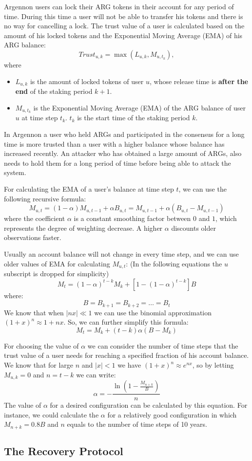 Argennon users can lock their ARG tokens in their account for any period of time. During this time a user
will not be able to transfer his tokens and there is no way for cancelling a lock.
The trust value of a user is calculated based on the amount of his locked tokens and the
Exponential Moving Average (EMA) of his ARG balance:
\[
    Trust_{u,k} = \max (L_{u,k}, M_{u,t_k}),
\]
where
\begin{itemize}
    \item $L_{u,k}$ is the amount of locked tokens of user $u$, whose release time is \textbf{after the end} of
    the staking period $k+1$.
    \item $M_{u,t_k}$ is the Exponential Moving Average (EMA) of the ARG balance of user \(u\) at time step \(t_k\).
    $t_k$ is the start time of the staking period $k$.
\end{itemize}

In Argennon a user who held ARGs and participated in the consensus for a long time is more trusted
than a user with a higher balance whose balance has increased recently. An attacker who has obtained a large
amount of ARGs, also needs to hold them for a long period of time before being able to attack the system.

For calculating the EMA of a user's balance at time step \(t\), we can use the following
recursive formula:
\[
    M_{u,t} = (1 - \alpha) M_{u,t-1} + \alpha B_{u,t} = M_{u,t-1} + \alpha (B_{u,t} - M_{u,t-1})
\]
where the coefficient \(\alpha\) is a constant smoothing factor between \(0\) and \(1\), which represents the
degree of weighting decrease. A higher \(\alpha\) discounts older observations faster.

Usually an account balance will not change in every time step, and we can use older values of EMA for calculating
\(M_{u,t}\): (In the following equations the \(u\) subscript is dropped for simplicity)
\[
    M_{t} = (1 - \alpha)^{t-k}M_{k} + [1 - (1 - \alpha)^{t - k}]B
\]
where:
\[
    B = B_{k+1} = B_{k+2} = \dots = B_{t}
\]
We know that when \(|nx| \ll 1\) we can use the binomial approximation \({(1 + x)^n \approx 1 + nx}\). So, we can
further simplify this formula:
\[
    M_{t} = M_{k} + (t - k) \alpha (B - M_{k})
\]

For choosing the value of \(\alpha\) we can consider the number of time steps that the trust value of a user needs
for reaching a specified fraction of his account balance. We know that for large \(n\) and \(|x| < 1\) we have
\((1 + x)^n \approx e^{nx}\), so by letting \(M_{u,k} = 0\) and \(n = t - k\) we can write:
\[
    \alpha =- \frac{\ln\left(1 - \frac{M_{n+k}}{B}\right)}{n}
\]
The value of \(\alpha\) for a desired configuration can be calculated by this equation. For instance, we could
calculate the \(\alpha\) for a relatively good configuration in which \(M_{n+k} = 0.8B\) and \(n\) equals to the
number of time steps of 10 years.


\subsection{The Recovery Protocol}\label{subsec:recovery}

